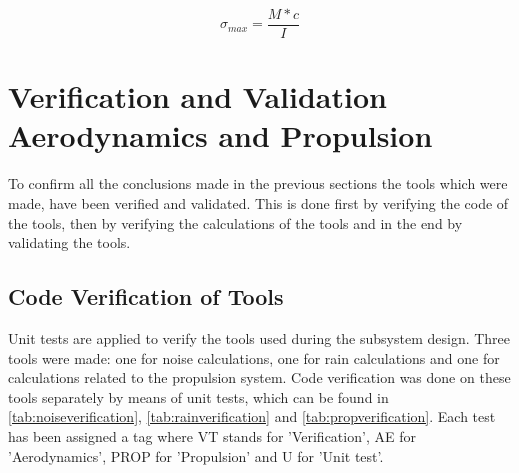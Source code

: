 \begin{equation}
\label{eq:sigma}
    \sigma_{max} = \frac{M*c}{I}
\end{equation}


\section{Verification and Validation Aerodynamics and  Propulsion}
\label{sec:propverificationandvalidation}

To confirm all the conclusions made in the previous sections the tools which were made, have been verified and validated. This is done first by verifying the code of the tools, then by verifying the calculations of the tools and in the end by validating the tools.

\subsection{Code Verification of Tools}
\label{sub:codeverifciationprop}
Unit tests are applied to verify the tools used during the subsystem design. Three tools were made: one for noise calculations, one for rain calculations and one for calculations related to the propulsion system. Code verification was done on these tools separately by means of unit tests, which can be found in \autoref{tab:noiseverification}, \autoref{tab:rainverification} and \autoref{tab:propverification}. Each test has been assigned a tag where VT stands for ’Verification’, AE for ’Aerodynamics’, PROP for 'Propulsion' and U for ’Unit test’.



